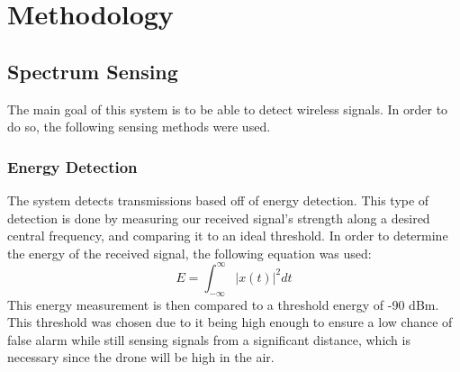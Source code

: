 \chapter{Methodology}
\section{Spectrum Sensing} \label{methods:processing}
The main goal of this system is to be able to detect wireless signals. In order to do so, the following sensing methods were used.
\subsection{Energy Detection}
The system detects transmissions based off of energy detection. This type of detection is done by measuring our received signal’s strength along a desired central frequency, and comparing it to an ideal threshold. In order to determine the energy of the received signal, the following equation was used:
\[E = \int_{-\infty}^{\infty}| x(t) |^2dt\]
This energy measurement is then compared to a threshold energy of -90 dBm. This threshold was chosen due to it being high enough to ensure a low chance of false alarm while still sensing signals from a significant distance, which is necessary since the drone will be high in the air. \par

